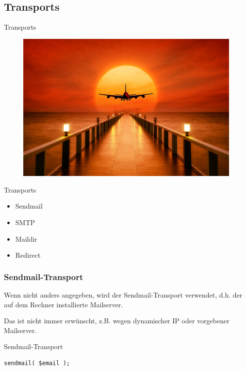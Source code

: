 \subsection{Transports}

\begin{frame}{Transports}
  \begin{figure}[!ht]
    \centering
    \includegraphics[width=0.9\linewidth]{img/sunset-3193002_1920.jpg}
  \end{figure}
\end{frame}

\begin{frame}{Transports}
  \begin{itemize}
    \item Sendmail
    \item SMTP
    \item Maildir
    \item Redirect
  \end{itemize}
\end{frame}

\subsubsection{Sendmail-Transport}

Wenn nicht anders angegeben, wird der Sendmail-Transport verwendet, d.h. der
auf dem Rechner installierte Mailserver.

Das ist nicht immer erwünscht, z.B. wegen dynamischer IP oder vorgebener
Mailserver.

\begin{frame}[fragile]{Sendmail-Transport}
\begin{verbatim}
sendmail( $email );
\end{verbatim}
\end{frame}

